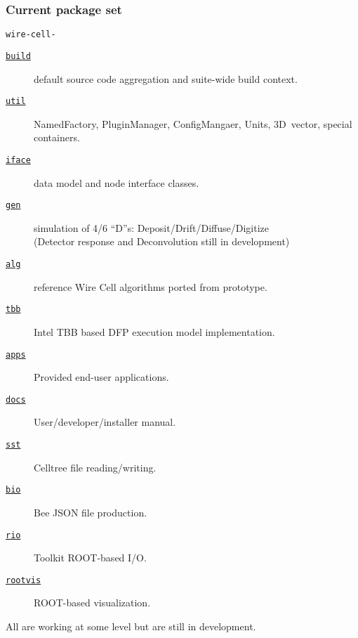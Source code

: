 \documentclass[xcolor=dvipsnames]{beamer}
\begin{document}
\begin{frame}
  \frametitle{Current package set}
  \footnotesize
  \texttt{wire-cell-}
  \begin{description}
  \item[\href{https://github.com/WireCell/wire-cell-build}{\texttt{build}}] 
    default source code aggregation and suite-wide build context.
  \item[\href{https://github.com/WireCell/wire-cell-util}{\texttt{util}}]
    NamedFactory, PluginManager, ConfigMangaer, Units, 3D~vector, special containers.
  \item[\href{https://github.com/WireCell/wire-cell-iface}{\texttt{iface}}] 
    data model and node interface classes.
  \item[\href{https://github.com/WireCell/wire-cell-gen}{\texttt{gen}}]
    simulation of 4/6 ``D''s: Deposit/Drift/Diffuse/Digitize \\
    (Detector response and Deconvolution still in development)
  \item[\href{https://github.com/WireCell/wire-cell-alg}{\texttt{alg}}]
    reference Wire Cell algorithms ported from prototype.
  \item[\href{https://github.com/WireCell/wire-cell-tbb}{\texttt{tbb}}]
    Intel TBB based DFP execution model implementation.
  \item[\href{https://github.com/WireCell/wire-cell-apps}{\texttt{apps}}]
    Provided end-user applications.
  \item[\href{https://github.com/WireCell/wire-cell-docs}{\texttt{docs}}]
    User/developer/installer manual.
  \item[\href{https://github.com/WireCell/wire-cell-sst}{\texttt{sst}}]
    Celltree file reading/writing.
  \item[\href{https://github.com/WireCell/wire-cell-bio}{\texttt{bio}}]
    Bee JSON file production.
  \item[\href{https://github.com/WireCell/wire-cell-rio}{\texttt{rio}}]
    Toolkit ROOT-based I/O.
  \item[\href{https://github.com/WireCell/wire-cell-rio}{\texttt{rootvis}}]
    ROOT-based visualization.
  \end{description}
  All are working at some level but are still in development.
\end{frame}
\end{document}
